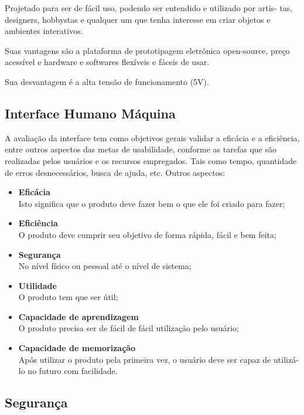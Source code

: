 	Projetado para ser de fácil uso, podendo ser entendido e utilizado por artis- tas, designers, hobbystas e qualquer um que tenha interesse em criar objetos e ambientes interativos.

	Suas vantagens são a plataforma de prototipagem eletrônica open-source, preço acessível e hardware e softwares flexíveis e fáceis de usar.

	Sua desvantagem é a alta tensão de funcionamento (5V).

\subsection{Interface Humano Máquina}

	A avaliação da interface tem como objetivos gerais validar a eficácia e a eficiência, entre outros aspectos das metas de usabilidade, conforme as tarefas que são realizadas pelos usuários e os recursos empregados. Tais como tempo, quantidade de erros desnecessários, busca de ajuda, etc. Outros aspectos:

\begin{itemize}
	\item \textbf{Eficácia}\\
	Isto significa que o produto deve fazer bem o que ele foi criado para fazer;

	\item \textbf{Eficiência}\\
O produto deve cumprir seu objetivo de forma rápida, fácil e bem feita;

	\item \textbf{Segurança}\\
No nível físico ou pessoal até o nível de sistema;

	\item \textbf{Utilidade}\\
O produto tem que ser útil;

	\item \textbf{Capacidade de aprendizagem}\\
O produto precisa ser de fácil de fácil utilização pelo usuário;

	\item \textbf{Capacidade de memorização}\\
Após utilizar o produto pela primeira vez, o usuário deve ser capaz de utilizá-lo no futuro com facilidade.
\end{itemize}

\subsection{Segurança}

